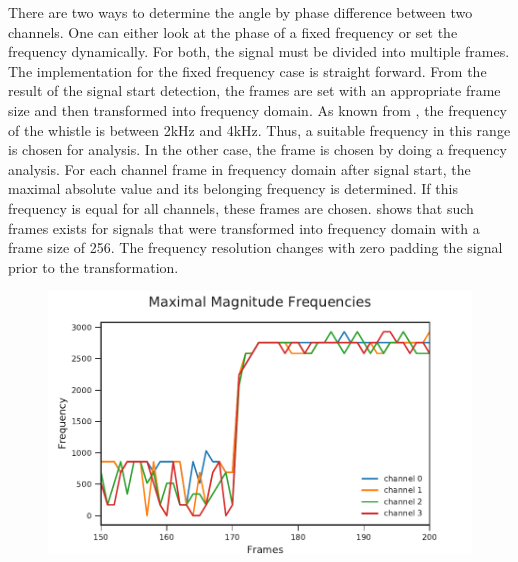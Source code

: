 
There are two ways to determine the angle by phase difference
between two channels.
One can either look at the phase of a fixed frequency or set the frequency
dynamically.
For both, the signal must be divided into multiple frames.
The implementation for the fixed frequency case is straight forward.
From the result of the signal start detection, the frames
are set with an appropriate frame size and then transformed into
frequency domain.
As known from \cite{Hasselbring}, the frequency of the whistle is between 2\si{\kilo\hertz}
and 4\si{\kilo\hertz}.
Thus, a suitable frequency in this range is chosen for analysis.
In the other case, the frame is chosen by doing a
frequency analysis.
For each channel frame in frequency domain after signal start,
the maximal absolute value and its belonging frequency is determined.
If this frequency is equal for all channels, these frames
are chosen.
 shows that such frames exists for signals that
were transformed into frequency domain with a frame size of 256.
The frequency resolution changes with zero padding the signal prior
to the transformation.
\begin{figure}[ht]
	\centering
		\includegraphics[]{figures/maxFreq}
	\caption{}
    \label{fig:03_maxFreq}
\end{figure}

